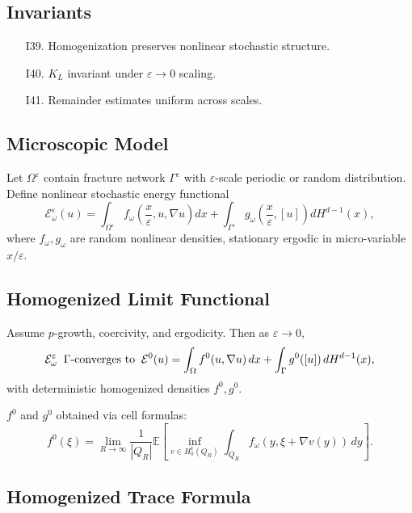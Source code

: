 \subsection*{Invariants}

\begin{itemize}
  \item[I39.] Homogenization preserves nonlinear stochastic structure.  
  \item[I40.] $K_L$ invariant under $\varepsilon \to 0$ scaling.  
  \item[I41.] Remainder estimates uniform across scales.  
\end{itemize}

\subsection{Microscopic Model}

Let $\Omega^\varepsilon$ contain fracture network $\Gamma^\varepsilon$ with $\varepsilon$-scale periodic or random distribution.  
Define nonlinear stochastic energy functional
\[
\mathcal{E}^\varepsilon_\omega(u) = \int_{\Omega^\varepsilon}
f_\omega\!\left(\frac{x}{\varepsilon},u,\nabla u\right)dx
+ \int_{\Gamma^\varepsilon} g_\omega\!\left(\frac{x}{\varepsilon},[u]\right)dH^{d-1}(x),
\]
where $f_\omega,g_\omega$ are random nonlinear densities, stationary ergodic in micro-variable $x/\varepsilon$.

\subsection{Homogenized Limit Functional}

\begin{theorem}
Assume $p$-growth, coercivity, and ergodicity. Then as $\varepsilon \to 0$,
\[
\mathcal{E}^\varepsilon_\omega \;\;\Gamma\hbox{-converges to}\;\;
\mathcal{E}^0(u) = \int_\Omega f^0(u,\nabla u)\,dx + \int_\Gamma g^0([u])\,dH^{d-1}(x),
\]
with deterministic homogenized densities $f^0,g^0$.  
\end{theorem}

\begin{remark}
$f^0$ and $g^0$ obtained via cell formulas:
\[
f^0(\xi) = \lim_{R\to\infty}\frac{1}{|Q_R|}
\mathbb{E}\!\left[ \inf_{v\in H^1_0(Q_R)} 
\int_{Q_R} f_\omega(y,\xi+\nabla v(y))\,dy\right].
\]
\end{remark}

\subsection{Homogenized Trace Formula}

